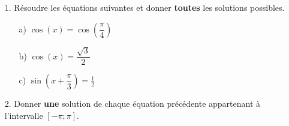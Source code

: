 \documentclass[12pt]{article}
\begin{document}
\begin{enumerate}
\item[1.] Résoudre les équations suivantes et donner \textbf{toutes} les solutions possibles.
  \begin{multicols}{3}
    \begin{enumerate}
    \item[a)] $\cos(x) = \cos(\dfrac{\pi}{4})$
    \item[b)] $\cos(x) = \dfrac{\sqrt{3}}{2}$
    \item[c)] $\sin(x + \dfrac{\pi}{3}) = \frac{1}{2}$ 
    \end{enumerate}
  \end{multicols}
\item[2.] Donner \textbf{une} solution de chaque équation précédente appartenant à l'intervalle $[- \pi ; \pi]$.
\end{enumerate}
\end{document}
